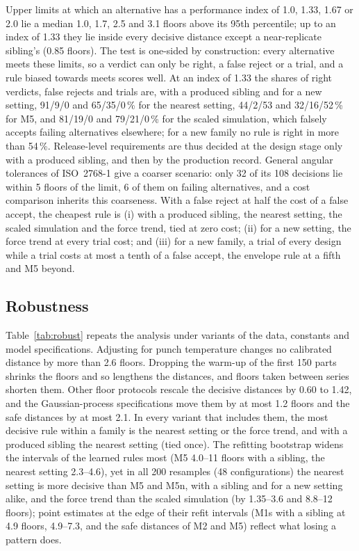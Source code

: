 \documentclass[pdflatex,sn-basic,lineno]{sn-jnl}
\providecommand{\DIFadd}[1]{{\protect\color{blue}\uwave{#1}}} %
\providecommand{\DIFaddbegin}{} %
\providecommand{\DIFaddend}{} %
\newcommand{\DIFaddincludegraphics}[2][]{{\color{blue}\fbox{\DIFOincludegraphics[#1]{#2}}}} %
\DeclareRobustCommand{\DIFaddbegin}{\DIFOaddbegin \let\includegraphics\DIFaddincludegraphics} %
\DeclareRobustCommand{\DIFaddend}{\DIFOaddend \let\includegraphics\DIFOincludegraphics} %
\begin{document}
Upper limits at which an alternative has a performance index of 1.0, 1.33, 1.67 or 2.0 lie a median 1.0, 1.7, 2.5 and 3.1 floors above its 95th percentile; up to an index of 1.33 they lie inside every decisive distance except a near-replicate sibling's (0.85 floors). The test is one-sided by construction: every alternative meets these limits, so a verdict can only be right, a false reject or a trial, and a rule biased towards meets scores well. At an index of 1.33 the shares of right verdicts, false rejects and trials are, with a produced sibling and for a new setting, 91/9/0 and 65/35/0\,\% for the nearest setting, 44/2/53 and 32/16/52\,\% for M5, and 81/19/0 and 79/21/0\,\% for the scaled simulation, which falsely accepts failing alternatives elsewhere; for a new family no rule is right in more than 54\,\%. Release-level requirements are thus decided at the design stage only with a produced sibling, and then by the production record. General angular tolerances of ISO~2768-1 \citep{iso1989tolerances} give a coarser scenario: only 32 of its 108 decisions lie within 5 floors of the limit, 6 of them on failing alternatives, and a cost comparison inherits this coarseness. With a false reject at half the cost of a false accept, the cheapest rule is (i) with a produced sibling, the nearest setting, the scaled simulation and the force trend, tied at zero cost; (ii) for a new setting, the force trend at every trial cost\DIFaddbegin \DIFadd{, by three false rejects of the nearest setting among 108 decisions}\DIFaddend ; and (iii) for a new family, a trial of every design while a trial costs at most a tenth of a false accept, the envelope rule at a fifth and M5 beyond.

\subsection{Robustness}\label{sec:res-robust}

Table~\ref{tab:robust} repeats the analysis under variants of the data, constants and model specifications. Adjusting for punch temperature changes no calibrated distance by more than 2.6 floors. Dropping the warm-up of the first 150 parts shrinks the floors and so lengthens the distances, and floors taken between series shorten them. Other floor protocols rescale the decisive distances by 0.60 to 1.42, and the Gaussian-process specifications move them by at most 1.2 floors and the safe distances by at most 2.1. In every variant that includes them, the most decisive rule within a family is the nearest setting or the force trend, and with a produced sibling the nearest setting (tied once). The refitting bootstrap widens the intervals of the learned rules most (M5 4.0--11 floors with a sibling, the nearest setting 2.3--4.6), yet in all 200 resamples (48 configurations) the nearest setting is more decisive than M5 and M5n, with a sibling and for a new setting alike, and the force trend than the scaled simulation (by 1.35--3.6 and 8.8--12 floors); point estimates at the edge of their refit intervals (M1s with a sibling at 4.9 floors, 4.9--7.3, and the safe distances of M2 and M5) reflect what losing a pattern does.
\end{document}
